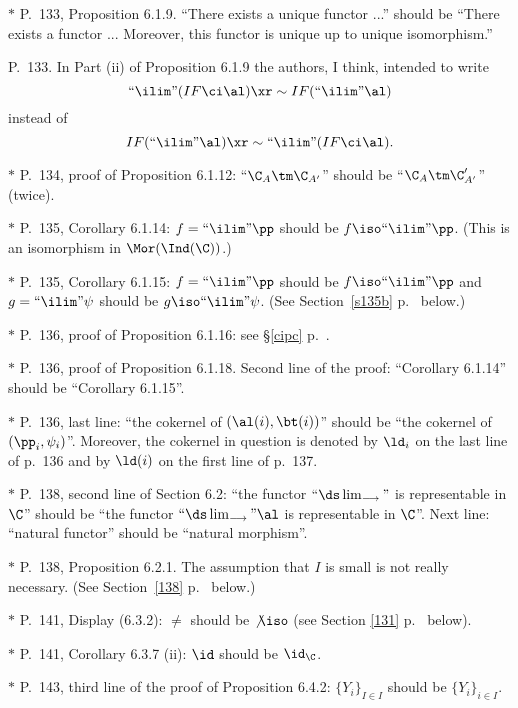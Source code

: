 \documentclass[12pt]{article}
\theoremstyle{remark}
\theoremstyle{definition}
\begin{document}
\nn$*$ P.~133, Proposition 6.1.9. ``There exists a unique functor ...'' should be ``There exists a functor ... Moreover, this functor is unique up to unique isomorphism.''

\begin{s} 
P.~133. In Part (ii) of Proposition 6.1.9 the authors, I think, intended to write 
$$
``\ilim"(IF\ci\al)\xr\sim IF(``\ilim"\al)
$$
instead of 
$$
IF(``\ilim"\al)\xr\sim``\ilim"(IF\ci\al). 
$$ 
\end{s}

\nn$*$ P.~134, proof of Proposition 6.1.12: ``$\C_A\tm\C_{A'}$'' should be ``$\C_A\tm\C'_{A'}$'' (twice).

\nn$*$ P.~135, Corollary 6.1.14: $f=``\ilim"\pp$ should be $f\iso``\ilim"\pp$. (This is an isomorphism in $\Mor(\Ind(\C))$.)

\begin{s}
$*$ P.~135, Corollary 6.1.15: $f=``\ilim"\pp$ should be $f\iso``\ilim"\pp$ and $g=``\ilim"\psi$ should be $g\iso``\ilim"\psi$. (See Section~\ref{s135b} p.~ below.)
\end{s}

\nn$*$ P.~136, proof of Proposition 6.1.16: see \S\ref{cipc} p.~.

\nn$*$ P.~136, proof of Proposition 6.1.18. Second line of the proof: ``Corollary 6.1.14'' should be ``Corollary 6.1.15''. 

\nn$*$ P.~136, last line: ``the cokernel of $(\al(i),\bt(i))$'' should be ``the cokernel of $(\pp_i,\psi_i)$''. Moreover, the cokernel in question is denoted by $\ld_i$ on the last line of p.~136 and by $\ld(i)$ on the first line of p.~137.

\nn$*$ P.~138, second line of Section 6.2: ``the functor $``\ds\lim_{\longrightarrow}"$ is representable in $\C$'' should be ``the functor $``\ds\lim_{\longrightarrow}"\al$ is representable in $\C$''. Next line: ``natural functor'' should be ``natural morphism''.

\nn$*$ P.~138, Proposition 6.2.1. The assumption that $I$ is small is not really necessary. (See Section~\ref{138} p.~ below.) 

\nn$*$ P.~141, Display (6.3.2): $\neq$ should be $\not\iso$ (see Section \ref{131} p.~ below). 

\nn$*$ P.~141, Corollary 6.3.7 (ii): $\id$ should be $\id_\C$. 

\nn$*$ P.~143, third line of the proof of Proposition 6.4.2: $\{Y_i\}_{I\in I}$ should be $\{Y_i\}_{i\in I}$.
\end{document}
